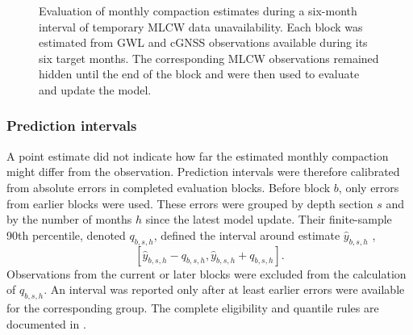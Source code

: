 \begin{figure}[htbp]
  \centering
  \caption{Evaluation of monthly compaction estimates during a six-month interval of temporary MLCW data unavailability. Each block was estimated from GWL and cGNSS observations available during its six target months. The corresponding MLCW observations remained hidden until the end of the block and were then used to evaluate and update the model.}
  \label{fig:delayed_observation_design}
\end{figure}

\subsubsection{Prediction intervals}
\label{subsec:uncertainty}

A point estimate did not indicate how far the estimated monthly compaction might differ from the observation. Prediction intervals were therefore calibrated from absolute errors in completed evaluation blocks. Before block $b$, only errors from earlier blocks were used. These errors were grouped by depth section $s$ and by the number of months $h$ since the latest model update. Their finite-sample 90th percentile, denoted $q_{b,s,h}$, defined the interval around estimate $\widehat{y}_{b,s,h}$ \citep{angelopoulos_conformal_2023},
\begin{equation}
\left[
\widehat{y}_{b,s,h}-q_{b,s,h},
\widehat{y}_{b,s,h}+q_{b,s,h}
\right].
\label{eq:prediction_interval}
\end{equation}
Observations from the current or later blocks were excluded from the calculation of $q_{b,s,h}$. An interval was reported only after at least  earlier errors were available for the corresponding group. The complete eligibility and quantile rules are documented in .

